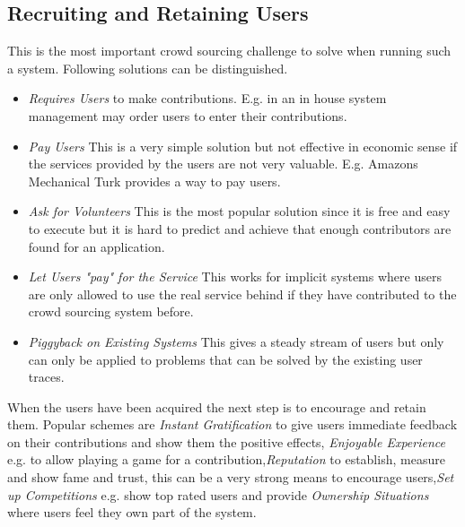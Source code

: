 \documentclass{sig-alternate}
\begin{document}
\subsection{Recruiting and Retaining Users}
This is the most important crowd sourcing challenge to solve when running such a system. Following solutions can be distinguished.
\begin{itemize}
\item \textit{Requires Users} to make contributions. E.g. in an in house system management may order users to enter their contributions.
\item \textit{Pay Users} This is a very simple solution but not effective in economic sense if the services provided by the users are not very valuable. E.g. Amazons Mechanical Turk provides a way to pay users.
\item \textit{Ask for Volunteers} This is the most popular solution since it is free and easy to execute but it is hard to predict and achieve that enough contributors are found for an application.
\item \textit{Let Users "pay" for the Service} This works for implicit systems where users are only allowed to use the real service behind if they have contributed to the crowd sourcing system before.
\item \textit{Piggyback on Existing Systems} This gives a steady stream of users but only can only be applied to problems that can be solved by the existing user traces.
\end{itemize}
When the users have been acquired the next step is to encourage and retain them. Popular schemes are \textit{Instant Gratification} to give users immediate feedback on their contributions and show them the positive effects, \textit{Enjoyable Experience} e.g. to allow playing a game for a contribution,\textit{Reputation} to establish, measure and show fame and trust, this can be a very strong means to encourage users,\textit{Set up Competitions} e.g. show top rated users and provide \textit{Ownership Situations} where users feel they own part of the system.
\end{document}
